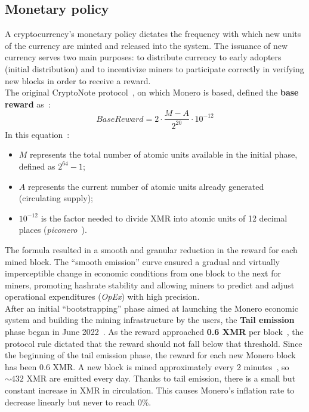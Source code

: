 \documentclass[conference]{IEEEtran}
\begin{document}
\subsection{Monetary policy}
A cryptocurrency's monetary policy dictates the frequency with which new units of the currency are minted and released into the system. The issuance of new currency serves two main purposes: to distribute currency to early adopters (initial distribution) and to incentivize miners to participate correctly in verifying new blocks in order to receive a reward.\\
The original CryptoNote protocol~\cite{cryptonote}, on which Monero is based, defined the \textbf{base reward} as~\cite{monero_note_on_fees}:
\[
BaseReward = 2 \cdot \frac{M - A}{2^{20}} \cdot 10^{-12}
\]
In this equation~\cite{monero_note_on_fees}:
\begin{itemize}
\item $M$ represents the total number of atomic units available in the initial phase, defined as $2^{64} - 1$;
\item $A$ represents the current number of atomic units already generated (circulating supply);
\item $10^{-12}$ is the factor needed to divide XMR into atomic units of 12 decimal places (\textit{piconero}~\cite{monero_denominations}).
\end{itemize}
\medskip
The formula resulted in a smooth and granular reduction in the reward for each mined block. The ``smooth emission'' curve ensured a gradual and virtually imperceptible change in economic conditions from one block to the next for miners, promoting hashrate stability and allowing miners to predict and adjust operational expenditures (\textit{OpEx}) with high precision.\\
After an initial ``bootstrapping'' phase aimed at launching the Monero economic system and building the mining infrastructure by the users, the \textbf{Tail emission} phase began in June 2022~\cite{tail_emission_moneropedia}. As the reward approached \textbf{0.6 XMR} per block~\cite{monero_technical_specs}, the protocol rule dictated that the reward should not fall below that threshold. Since the beginning of the tail emission phase, the reward for each new Monero block has been 0.6 XMR. A new block is mined approximately every 2 minutes~\cite{monero_technical_specs}, so $\sim432$ XMR are emitted every day. Thanks to tail emission, there is a small but constant increase in XMR in circulation. This causes Monero's inflation rate to decrease linearly but never to reach 0\%.\\
\end{document}
